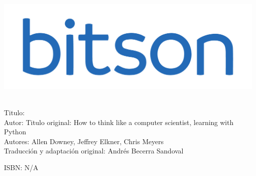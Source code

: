 \vfill{}


\newpage{}
\newpage{}


\thispagestyle{empty} \vfill{}
\includegraphics[scale=0.3]{illustrations/logotipo-alpha.png} \\

\parindent0pt {\tiny{}\ }{\tiny \par}

%

{\scriptsize{}Titulo: \introprog }\\
{\scriptsize{}Autor: \AutorNombreCompleto}
{\scriptsize{}Titulo original: How to think like a computer scientist, learning with Python}\\
{\scriptsize{}Autores: Allen Downey, Jeffrey Elkner, Chris Meyers }\\
{\scriptsize{}Traducción y adaptación original: Andrés Becerra Sandoval }\\
{\scriptsize \par}

{\scriptsize{}ISBN: N/A}\\
{\scriptsize \par}

